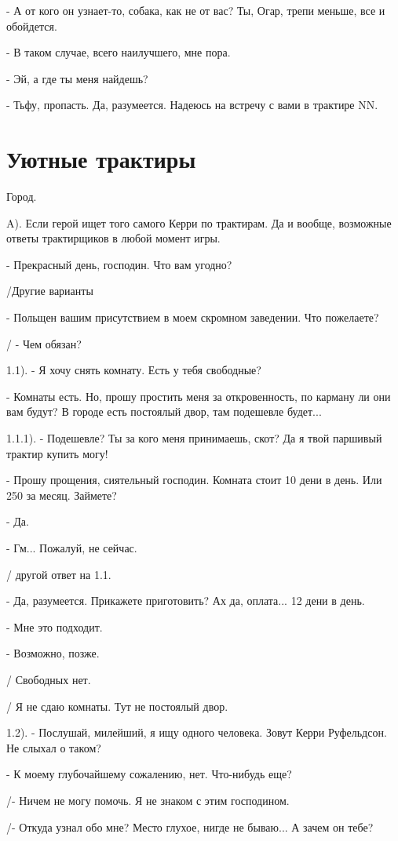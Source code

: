 \documentclass[12pt,a4paper]{book}
\begin{document}
- А от кого он узнает-то, собака, как не от вас? Ты, Огар, трепи меньше, все и обойдется.

- В таком случае, всего наилучшего, мне пора.

- Эй, а где ты меня найдешь?

- Тьфу, пропасть. Да, разумеется. Надеюсь на встречу с вами в трактире NN.

\section{Уютные трактиры}

Город.

A). Если герой ищет того самого Керри по трактирам. Да и вообще, возможные ответы трактирщиков в любой момент игры.

- Прекрасный день, господин. Что вам угодно?

/Другие варианты

- Польщен вашим присутствием в моем скромном заведении. Что пожелаете?

/ - Чем обязан?

1.1). - Я хочу снять комнату. Есть у тебя свободные?

- Комнаты есть. Но, прошу простить меня за откровенность, по карману ли они вам будут? В городе есть постоялый двор, там подешевле будет...

1.1.1). - Подешевле? Ты за кого меня принимаешь, скот? Да я твой паршивый трактир купить могу!

- Прошу прощения, сиятельный господин. Комната стоит 10 дени в день. Или 250 за месяц. Займете?

 - Да.

 - Гм... Пожалуй, не сейчас.

/ другой ответ на 1.1.

- Да, разумеется. Прикажете приготовить? Ах да, оплата... 12 дени в день.

- Мне это подходит.

- Возможно, позже.

/ Свободных нет.

/ Я не сдаю комнаты. Тут не постоялый двор.

1.2). - Послушай, милейший, я ищу одного человека. Зовут Керри Руфельдсон. Не слыхал о таком?

- К моему глубочайшему сожалению, нет. Что-нибудь еще?

/- Ничем не могу помочь. Я не знаком с этим господином.

/- Откуда узнал обо мне? Место глухое, нигде не бываю... А зачем он тебе?
\end{document}
